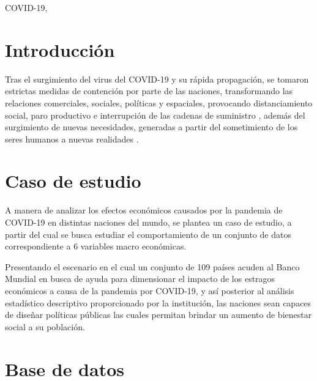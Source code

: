 \documentclass[conference]{IEEEtran}
\begin{document}
\begin{abstract}

\end{abstract}

\begin{IEEEkeywords}
COVID-19, 
\end{IEEEkeywords}

\section{Introducción}

Tras el surgimiento del virus del COVID-19 y su rápida propagación, se tomaron estrictas medidas de contención por parte de las naciones, transformando las relaciones comerciales, sociales, políticas y espaciales, provocando distanciamiento social, paro productivo e interrupción de las cadenas de suministro \cite{espitia2022}, además del surgimiento de nuevas necesidades, generadas a partir del sometimiento de los seres humanos a nuevas realidades \cite{djokic2022}. 

\section{Caso de estudio}

A manera de analizar los efectos económicos causados por la pandemia de COVID-19 en distintas naciones del mundo, se plantea un caso de estudio, a partir del cual se busca estudiar el comportamiento de un conjunto de datos correspondiente a 6 variables macro económicas. 

Presentando el escenario en el cual un conjunto de 109 países acuden al Banco Mundial en busca de ayuda para dimensionar el impacto de los estragos económicos a causa de la pandemia por COVID-19, y así posterior al análisis estadístico descriptivo proporcionado por la institución, las naciones sean capaces de diseñar políticas públicas las cuales permitan brindar un aumento de bienestar social a su población.

\section{Base de datos}
\end{document}
